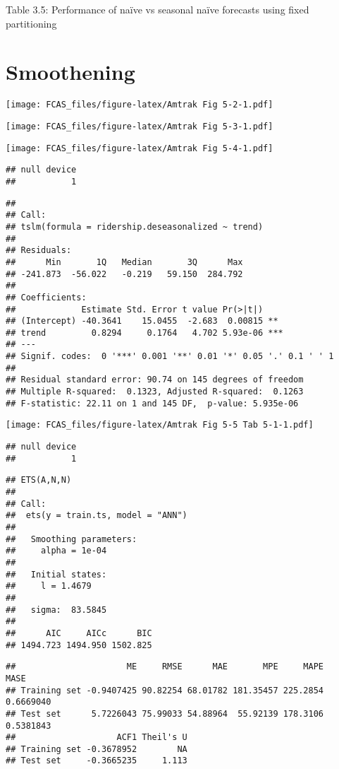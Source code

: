 \documentclass[]{article}
\begin{document}
Table 3.5: Performance of naïve vs seasonal naïve forecasts using fixed
partitioning

\section{Smoothening}\label{smoothening}

\texttt{[image: FCAS\_files/figure-latex/Amtrak Fig 5-2-1.pdf]}

\texttt{[image: FCAS\_files/figure-latex/Amtrak Fig 5-3-1.pdf]}

\texttt{[image: FCAS\_files/figure-latex/Amtrak Fig 5-4-1.pdf]}

\begin{verbatim}
## null device 
##           1
\end{verbatim}

\begin{verbatim}
## 
## Call:
## tslm(formula = ridership.deseasonalized ~ trend)
## 
## Residuals:
##      Min       1Q   Median       3Q      Max 
## -241.873  -56.022   -0.219   59.150  284.792 
## 
## Coefficients:
##             Estimate Std. Error t value Pr(>|t|)    
## (Intercept) -40.3641    15.0455  -2.683  0.00815 ** 
## trend         0.8294     0.1764   4.702 5.93e-06 ***
## ---
## Signif. codes:  0 '***' 0.001 '**' 0.01 '*' 0.05 '.' 0.1 ' ' 1
## 
## Residual standard error: 90.74 on 145 degrees of freedom
## Multiple R-squared:  0.1323, Adjusted R-squared:  0.1263 
## F-statistic: 22.11 on 1 and 145 DF,  p-value: 5.935e-06
\end{verbatim}

\texttt{[image: FCAS\_files/figure-latex/Amtrak Fig 5-5 Tab 5-1-1.pdf]}

\begin{verbatim}
## null device 
##           1
\end{verbatim}

\begin{verbatim}
## ETS(A,N,N) 
## 
## Call:
##  ets(y = train.ts, model = "ANN") 
## 
##   Smoothing parameters:
##     alpha = 1e-04 
## 
##   Initial states:
##     l = 1.4679 
## 
##   sigma:  83.5845
## 
##      AIC     AICc      BIC 
## 1494.723 1494.950 1502.825
\end{verbatim}

\begin{verbatim}
##                      ME     RMSE      MAE       MPE     MAPE      MASE
## Training set -0.9407425 90.82254 68.01782 181.35457 225.2854 0.6669040
## Test set      5.7226043 75.99033 54.88964  55.92139 178.3106 0.5381843
##                    ACF1 Theil's U
## Training set -0.3678952        NA
## Test set     -0.3665235     1.113
\end{verbatim}
\end{document}
